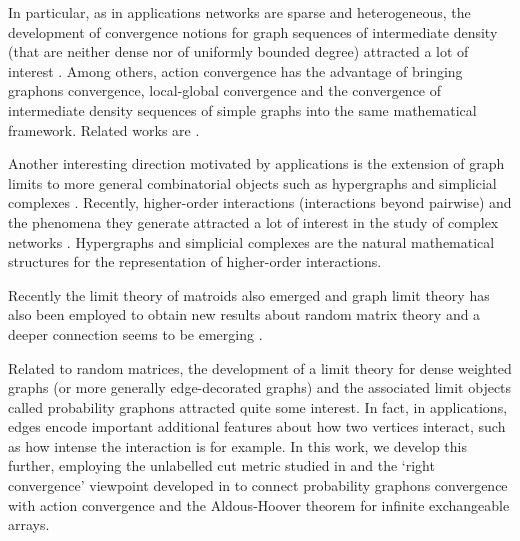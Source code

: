 \documentclass[11pt]{article}
\begin{document}
In particular, as in applications networks are sparse and heterogeneous, the development of convergence notions for graph sequences of intermediate density (that are neither dense nor of uniformly bounded degree) attracted a lot of interest \cite{BORGS20081801,borgs2011convergentAnnals,MarkovSpaces,KUNSZENTIKOVACS20191,frenkel2018convergence,backhausz2018action,veitch2015classrandomgraphsarising,janson2016graphons,caron2017sparse,borgs2018sparse,borgs2020identifiability,borgs2019sampling,10.1214/18-AOS1778,JANSON2022103549}. Among others, action convergence \cite{backhausz2018action} has the advantage of bringing graphons convergence, local-global convergence and the convergence of intermediate density sequences of simple graphs into the same mathematical framework. Related works are \cite{ArankaAction2022,MeasTheorActionZucal,zucal2023action}.

Another interesting direction motivated by applications is the extension of graph limits to more general combinatorial objects such as hypergraphs and simplicial complexes \cite{hypergrELEK20121731,HypergraphsSzegedy2,HypergraphonsZhao,zucal2023action}. Recently, higher-order interactions (interactions beyond pairwise) and the phenomena they generate attracted a lot of interest in the study of complex networks \cite{HypergraphsNetworks,HigerOrdIntBook,carletti2020dynamical,majhi2022dynamics,MHJ,HypergraphsDynamics,Bohle_2021,JOST2019870,JostMulasBook}. Hypergraphs and simplicial complexes are the natural mathematical structures for the representation of higher-order interactions.

Recently the limit theory of matroids also emerged \cite{SubModLovaszquotientconvergence,berczi2024cycle} and graph limit theory has also been employed to obtain new results about random matrix theory and a deeper connection seems to be emerging \cite{RandomMatricesGraphonsZhu,RandomMatrixGraphonmale2014,backhausz2018action}.

Related to random matrices, the development of a limit theory for dense weighted graphs (or more generally edge-decorated graphs) \cite{lovász2010limits, falgasravry2016multicolour, KUNSZENTIKOVACS2022109284,abraham2023probabilitygraphons,zucal2024probabilitygraphonsrightconvergence} and the associated limit objects called probability graphons attracted quite some interest. In fact, in applications, edges encode important additional features about how two vertices interact, such as how intense the interaction is for example. In this work, we develop this further, employing the unlabelled cut metric studied in \cite{abraham2023probabilitygraphons} and the  `right convergence' viewpoint developed in \cite{zucal2024probabilitygraphonsrightconvergence} to connect probability graphons convergence with action convergence \cite{backhausz2018action} and the Aldous-Hoover theorem for infinite exchangeable arrays\cite{aldous1981representations,aldous2010exchangeability,hoover1979relations,austin2008exchangeable,orbanz2014bayesian}.
\end{document}
